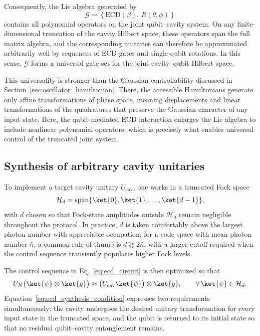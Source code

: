 Consequently, the Lie algebra generated by
\begin{equation}
    \mathcal{G}
    =
    \left\{
        \mathrm{ECD}(\beta),\,
        R(\theta,\phi)
    \right\}
\end{equation}
contains all polynomial operators on the joint qubit--cavity system. On any finite-dimensional truncation of the cavity Hilbert space, these operators span the full matrix algebra, and the corresponding unitaries can therefore be approximated arbitrarily well by sequences of ECD gates and single-qubit rotations. In this sense, \(\mathcal{G}\) forms a universal gate set for the joint cavity--qubit Hilbert space.

This universality is stronger than the Gaussian controllability discussed in Section~\ref{sec:oscillator_hamiltonian}. There, the accessible Hamiltonians generate only affine transformations of phase space, meaning displacements and linear transformations of the quadratures that preserve the Gaussian character of any input state. Here, the qubit-mediated ECD interaction enlarges the Lie algebra to include nonlinear polynomial operators, which is precisely what enables universal control of the truncated joint system.

\subsection{Synthesis of arbitrary cavity unitaries}

To implement a target cavity unitary \(U_{\mathrm{cav}}\), one works in a truncated Fock space
\begin{equation}
    \mathcal{H}_d = \mathrm{span}\{\ket{0},\ket{1},\dots,\ket{d-1}\},
\end{equation}
with \(d\) chosen so that Fock-state amplitudes outside \(\mathcal{H}_d\) remain negligible throughout the protocol. In practice, \(d\) is taken comfortably above the largest photon number with appreciable occupation; for a code space with mean photon number \(\bar{n}\), a common rule of thumb is \(d \gtrsim 2\bar{n}\), with a larger cutoff required when the control sequence transiently populates higher Fock levels.

The control sequence in Eq.~\eqref{eq:ecd_circuit} is then optimized so that
\begin{equation}
    U_N
    \bigl(
        \ket{\psi}\otimes\ket{g}
    \bigr)
    \approx
    \bigl(
        U_{\mathrm{cav}}\ket{\psi}
    \bigr)
    \otimes
    \ket{g},
    \qquad
    \forall\,\ket{\psi}\in\mathcal{H}_d.
    \label{eq:ecd_synthesis_condition}
\end{equation}
Equation~\eqref{eq:ecd_synthesis_condition} expresses two requirements simultaneously: the cavity undergoes the desired unitary transformation for every input state in the truncated space, and the qubit is returned to its initial state so that no residual qubit--cavity entanglement remains.

